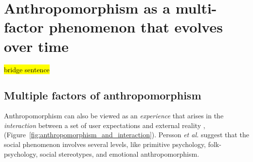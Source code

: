 \documentclass{frontiersSCNS} %
\begin{document}


%
%
%
%
%
%
%
%
%

\vspace{2cm}
\section{Anthropomorphism as a multi-factor phenomenon that evolves over time}
\label{sec:our-ideas}

\hl{bridge sentence}

\subsection*{Multiple factors of anthropomorphism}
\label{sec:multi-factors}

Anthropomorphism can also be viewed as an \textit{experience} that arises in the
\textit{interaction} between a set of user expectations and external reality
\cite{persson_anthropomorphism_2000},
(Figure~\ref{fig:anthropomorphism_and_interaction}). Persson \textit{et al.}
suggest that the social phenomenon involves several levels, like primitive
psychology, folk-psychology, social stereotypes, and emotional anthropomorphism. 
\end{document}
